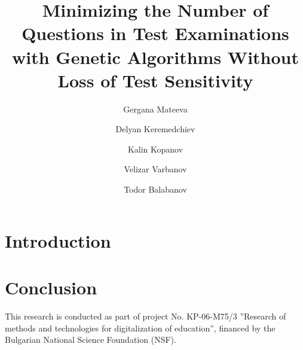 \documentclass[aip,cp,amsmath,amssymb,reprint,]{revtex4-2}
\begin{document}
\title{Minimizing the Number of Questions in Test Examinations with Genetic Algorithms Without Loss of Test Sensitivity}

\author{Gergana Mateeva}
\author{Delyan Keremedchiev}
\author{Kalin Kopanov}
\author{Velizar Varbanov}
\author{Todor Balabanov}


\begin{abstract}
\end{abstract}

\maketitle

\section{Introduction}

\section{Conclusion}

\begin{acknowledgments}
This research is conducted as part of project No. KP-06-M75/3 ''Research of methods and technologies for digitalization of education'', financed by the Bulgarian National Science Foundation (NSF).
\end{acknowledgments}

\nocite{*}

\end{document}
